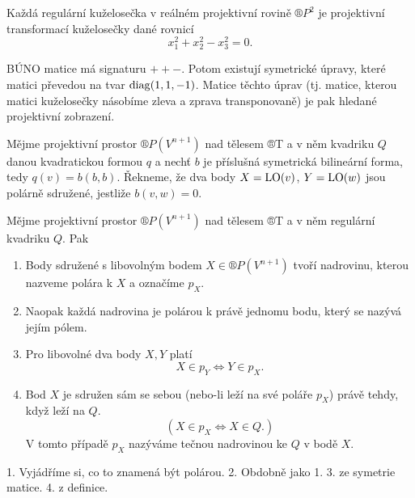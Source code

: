 \documentclass[12pt]{article}					%
\begin{document}

\begin{veta}
	Každá regulární kuželosečka v reálném projektivní rovině $®P^2$ je projektivní transformací kuželosečky dané rovnicí
	$$ x_1^2 + x_2^2 - x_3^2 = 0. $$

	\begin{dukazin}
		BÚNO matice má signaturu $++-$. Potom existují symetrické úpravy, které matici převedou na tvar $\operatorname{diag}(1, 1, -1)$. Matice těchto úprav (tj. matice, kterou matici kuželosečky násobíme zleva a zprava transponovaně) je pak hledané projektivní zobrazení.
	\end{dukazin}
\end{veta}

\begin{definice}
	Mějme projektivní prostor $®P(V^{n+1})$ nad tělesem ®T a v něm kvadriku $Q$ danou kvadratickou formou $q$ a nechť $b$ je příslušná symetrická bilineární forma, tedy $q(v) = b(b, b)$. Řekneme, že dva body $X = \operatorname{LO}(v)$, $Y=\operatorname{LO}(w)$ jsou polárně sdružené, jestliže $b(v, w) = 0$.
\end{definice}

\begin{veta}[O polaritě]
	Mějme projektivní prostor $®P(V^{n+1})$ nad tělesem ®T a v něm regulární kvadriku $Q$. Pak

	\begin{enumerate}
		\item Body sdružené s libovolným bodem $X \in ®P(V^{n+1})$ tvoří nadrovinu, kterou nazveme polára k $X$ a označíme $p_X$.
		\item Naopak každá nadrovina je polárou k právě jednomu bodu, který se nazývá jejím pólem.
		\item Pro libovolné dva body $X, Y$ platí
			$$ X \in p_Y \Leftrightarrow Y \in p_X. $$
		\item Bod $X$ je sdružen sám se sebou (nebo-li leží na své poláře $p_X$) právě tehdy, když leží na $Q$.
			$$ (X \in p_X \Leftrightarrow X \in Q.) $$
			V tomto případě $p_X$ nazýváme tečnou nadrovinou ke $Q$ v bodě $X$.
	\end{enumerate}

	\begin{dukazin}
		1. Vyjádříme si, co to znamená být polárou. 2. Obdobně jako 1. 3. ze symetrie matice. 4. z definice.
	\end{dukazin}
\end{veta}
\end{document}
